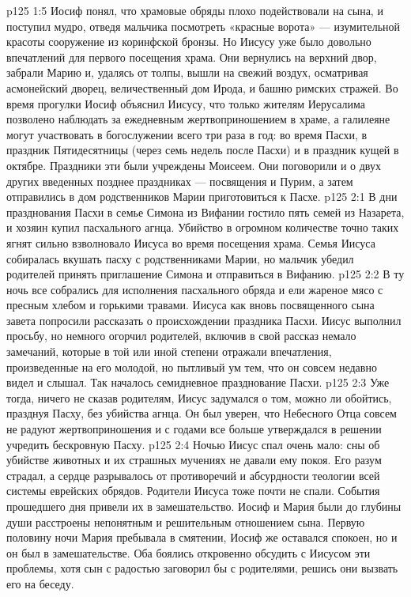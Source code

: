 \vs p125 1:5 Иосиф понял, что храмовые обряды плохо подействовали на сына, и поступил мудро, отведя мальчика посмотреть «красные ворота» --- изумительной красоты сооружение из коринфской бронзы. Но Иисусу уже было довольно впечатлений для первого посещения храма. Они вернулись на верхний двор, забрали Марию и, удалясь от толпы, вышли на свежий воздух, осматривая асмонейский дворец, величественный дом Ирода, и башню римских стражей. Во время прогулки Иосиф объяснил Иисусу, что только жителям Иерусалима позволено наблюдать за ежедневным жертвоприношением в храме, а галилеяне могут участвовать в богослужении всего три раза в год: во время Пасхи, в праздник Пятидесятницы (через семь недель после Пасхи) и в праздник кущей в октябре. Праздники эти были учреждены Моисеем. Они поговорили и о двух других введенных позднее праздниках --- посвящения и Пурим, а затем отправились в дом родственников Марии приготовиться к Пасхе.
\vs p125 2:1 В дни празднования Пасхи в семье Симона из Вифании гостило пять семей из Назарета, и хозяин купил пасхального агнца. Убийство в огромном количестве точно таких ягнят сильно взволновало Иисуса во время посещения храма. Семья Иисуса собиралась вкушать пасху с родственниками Марии, но мальчик убедил родителей принять приглашение Симона и отправиться в Вифанию.
\vs p125 2:2 В ту ночь все собрались для исполнения пасхального обряда и ели жареное мясо с пресным хлебом и горькими травами. Иисуса как вновь посвященного сына завета попросили рассказать о происхождении праздника Пасхи. Иисус выполнил просьбу, но немного огорчил родителей, включив в свой рассказ немало замечаний, которые в той или иной степени отражали впечатления, произведенные на его молодой, но пытливый ум тем, что он совсем недавно видел и слышал. Так началось семидневное празднование Пасхи.
\vs p125 2:3 Уже тогда, ничего не сказав родителям, Иисус задумался о том, можно ли обойтись, празднуя Пасху, без убийства агнца. Он был уверен, что Небесного Отца совсем не радуют жертвоприношения и с годами все больше утверждался в решении учредить бескровную Пасху.
\vs p125 2:4 Ночью Иисус спал очень мало: сны об убийстве животных и их страшных мучениях не давали ему покоя. Его разум страдал, а сердце разрывалось от противоречий и абсурдности теологии всей системы еврейских обрядов. Родители Иисуса тоже почти не спали. События прошедшего дня привели их в замешательство. Иосиф и Мария были до глубины души расстроены непонятным и решительным отношением сына. Первую половину ночи Мария пребывала в смятении, Иосиф же оставался спокоен, но и он был в замешательстве. Оба боялись откровенно обсудить с Иисусом эти проблемы, хотя сын с радостью заговорил бы с родителями, решись они вызвать его на беседу.
